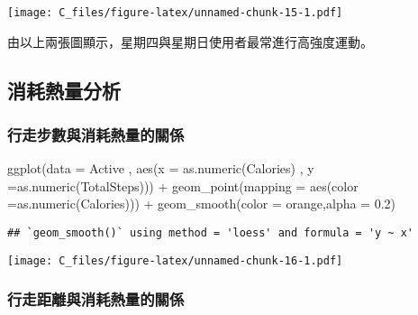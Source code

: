\documentclass[
]{article}
\newenvironment{Shaded}{\begin{snugshade}}{\end{snugshade}}
\newcommand{\AttributeTok}[1]{\textcolor[rgb]{0.77,0.63,0.00}{#1}}
\newcommand{\FloatTok}[1]{\textcolor[rgb]{0.00,0.00,0.81}{#1}}
\newcommand{\FunctionTok}[1]{\textcolor[rgb]{0.00,0.00,0.00}{#1}}
\newcommand{\NormalTok}[1]{#1}
\newcommand{\SpecialCharTok}[1]{\textcolor[rgb]{0.00,0.00,0.00}{#1}}
\newcommand{\StringTok}[1]{\textcolor[rgb]{0.31,0.60,0.02}{#1}}
\begin{document}
\texttt{[image: C\_files/figure-latex/unnamed-chunk-15-1.pdf]}

由以上兩張圖顯示，星期四與星期日使用者最常進行高強度運動。

\hypertarget{ux6d88ux8017ux71b1ux91cfux5206ux6790}{%
\subsection{消耗熱量分析}\label{ux6d88ux8017ux71b1ux91cfux5206ux6790}}

\hypertarget{ux884cux8d70ux6b65ux6578ux8207ux6d88ux8017ux71b1ux91cfux7684ux95dcux4fc2}{%
\subsubsection{行走步數與消耗熱量的關係}\label{ux884cux8d70ux6b65ux6578ux8207ux6d88ux8017ux71b1ux91cfux7684ux95dcux4fc2}}

\begin{Shaded}
\begin{Highlighting}[]
\FunctionTok{ggplot}\NormalTok{(}\AttributeTok{data =}\NormalTok{ Active , }\FunctionTok{aes}\NormalTok{(}\AttributeTok{x =} \FunctionTok{as.numeric}\NormalTok{(Calories) , }\AttributeTok{y =}\FunctionTok{as.numeric}\NormalTok{(TotalSteps))) }\SpecialCharTok{+} 
                  \FunctionTok{geom\_point}\NormalTok{(}\AttributeTok{mapping =} \FunctionTok{aes}\NormalTok{(}\AttributeTok{color =}\FunctionTok{as.numeric}\NormalTok{(Calories))) }\SpecialCharTok{+}
                  \FunctionTok{geom\_smooth}\NormalTok{(}\AttributeTok{color =} \StringTok{\textquotesingle{}orange\textquotesingle{}}\NormalTok{,}\AttributeTok{alpha =} \FloatTok{0.2}\NormalTok{)}
\end{Highlighting}
\end{Shaded}

\begin{verbatim}
## `geom_smooth()` using method = 'loess' and formula = 'y ~ x'
\end{verbatim}

\texttt{[image: C\_files/figure-latex/unnamed-chunk-16-1.pdf]}

\hypertarget{ux884cux8d70ux8dddux96e2ux8207ux6d88ux8017ux71b1ux91cfux7684ux95dcux4fc2}{%
\subsubsection{行走距離與消耗熱量的關係}\label{ux884cux8d70ux8dddux96e2ux8207ux6d88ux8017ux71b1ux91cfux7684ux95dcux4fc2}}
\end{document}
